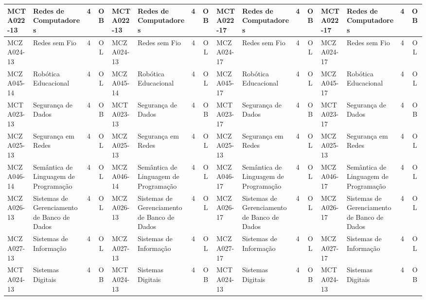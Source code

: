 \documentclass[a4paper]{article}
\begin{document}
\begin{landscape}
{\begin{longtable}{|l|p{.15\textheight}|c|c||l|p{.15\textheight}|c|c||l|p{.15\textheight}|c|c||l|p{.15\textheight}|c|c|}
    MCTA022-13 & Redes de Computadores & 4 & OB & 
    MCTA022-13 & Redes de Computadores & 4 & OB &
    MCTA022-17 & Redes de Computadores & 4 & OB & 
    MCTA022-17 & Redes de Computadores & 4 & OB \\ \hline

    MCZA024-13 & Redes sem Fio & 4 & OL &
    MCZA024-13 & Redes sem Fio & 4 & OL &
    MCZA024-17 & Redes sem Fio & 4 & OL &
    MCZA024-17 & Redes sem Fio & 4 & OL \\ \hline

    MCZA045-14 & Robótica Educacional & 4 & OL &
    MCZA045-14 & Robótica Educacional & 4 & OL &
    MCZA045-17 & Robótica Educacional & 4 & OL &
    MCZA045-17 & Robótica Educacional & 4 & OL \\ \hline
   
    MCTA023-13 & Segurança de Dados & 4 & OB & 
    MCTA023-13 & Segurança de Dados & 4 & OB & 
    MCTA023-17 & Segurança de Dados & 4 & OB & 
    MCTA023-17 & Segurança de Dados & 4 & OB \\ \hline

    MCZA025-13 & Segurança em Redes & 4 & OL &
    MCZA025-13 & Segurança em Redes & 4 & OL &
    MCZA025-13 & Segurança em Redes & 4 & OL & 
    MCZA025-13 & Segurança em Redes & 4 & OL \\ \hline

    MCZA046-14 & Semântica de Linguagem de Programação & 4 & OL &
    MCZA046-14 & Semântica de Linguagem de Programação & 4 & OL &
    MCZA046-17 & Semântica de Linguagem de Programação & 4 & OL &
    MCZA046-17 & Semântica de Linguagem de Programação & 4 & OL \\ \hline

    MCZA026-13 & Sistemas de Gerenciamento de Banco de Dados & 4 & OL &
    MCZA026-13 & Sistemas de Gerenciamento de Banco de Dados & 4 & OL &
    MCZA026-17 & Sistemas de Gerenciamento de Banco de Dados & 4 & OL & 
    MCZA026-17 & Sistemas de Gerenciamento de Banco de Dados & 4 & OL \\ \hline

    MCZA027-13 & Sistemas de Informação & 4 & OL &
    MCZA027-13 & Sistemas de Informação & 4 & OL &
    MCZA027-17 & Sistemas de Informação & 4 & OL &
    MCZA027-17 & Sistemas de Informação & 4 & OL \\ \hline

    MCTA024-13 & Sistemas Digitais & 4 & OB &
    MCTA024-13 & Sistemas Digitais & 4 & OB &
    MCTA024-13 & Sistemas Digitais & 4 & OB &
    MCTA024-13 & Sistemas Digitais & 4 & OB \\ \hline


\end{longtable}}
\end{landscape}
\end{document}
